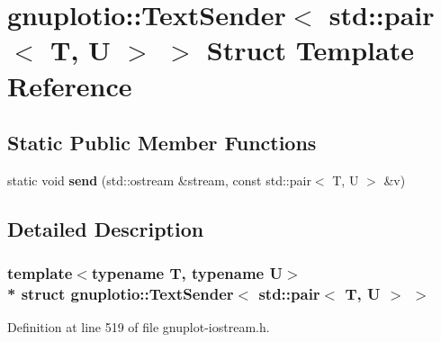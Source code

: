 \hypertarget{structgnuplotio_1_1_text_sender_3_01std_1_1pair_3_01_t_00_01_u_01_4_01_4}{}\section{gnuplotio\+:\+:Text\+Sender$<$ std\+:\+:pair$<$ T, U $>$ $>$ Struct Template Reference}
\label{structgnuplotio_1_1_text_sender_3_01std_1_1pair_3_01_t_00_01_u_01_4_01_4}
\subsection*{Static Public Member Functions}
\begin{DoxyCompactItemize}
\item 
static void {\bfseries send} (std\+::ostream \&stream, const std\+::pair$<$ T, U $>$ \&v)\hypertarget{structgnuplotio_1_1_text_sender_3_01std_1_1pair_3_01_t_00_01_u_01_4_01_4_ae1f3a6ffd8a60bb73d787578327154d1}{}\label{structgnuplotio_1_1_text_sender_3_01std_1_1pair_3_01_t_00_01_u_01_4_01_4_ae1f3a6ffd8a60bb73d787578327154d1}

\end{DoxyCompactItemize}


\subsection{Detailed Description}
\subsubsection*{template$<$typename T, typename U$>$\\*
struct gnuplotio\+::\+Text\+Sender$<$ std\+::pair$<$ T, U $>$ $>$}



Definition at line 519 of file gnuplot-\/iostream.\+h.

